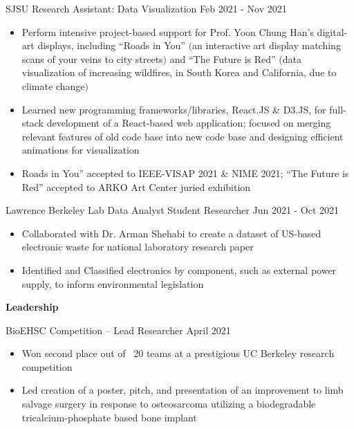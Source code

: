 \documentclass{article}
\begin{document}
\begin{spacing}{1.15}
\normalsize{
\noindent SJSU Research Assistant: Data Visualization \hfill Feb 2021 - Nov 2021
}
\small{
\begin{itemize}[noitemsep]
    \item Perform intensive project-based support for Prof. Yoon Chung Han’s digital-art displays, including “Roads in You” $($an interactive art display matching scans of your veins to city streets$)$ and “The Future is Red” $($data visualization of increasing wildfires,  in South Korea and California, due to climate change$)$
    \item Learned new programming frameworks/libraries, React.JS \& D3.JS, for full-stack development of a React-based web application; focused on merging relevant features of old code base into new code base and designing efficient animations for visualization
    \item Roads in You” accepted to IEEE-VISAP 2021 \& NIME 2021;  “The Future is Red” accepted to ARKO Art Center juried exhibition
\end{itemize}
\vspace*{0.15cm}
}

\normalsize{
\noindent Lawrence Berkeley Lab Data Analyst Student Researcher \hfill Jun 2021 - Oct 2021
}
\small{
\begin{itemize}[noitemsep]
    \item Collaborated with Dr. Arman Shehabi to create a dataset of US-based electronic waste for national laboratory research paper
    \item Identified and Classified electronics by component, such as external power supply, to inform environmental legislation
\end{itemize}
\vspace*{0.15cm}
}





\noindent\large{\bfseries Leadership \vspace*{0.2cm}} 

\normalsize{
\noindent BioEHSC Competition – Lead Researcher \hfill April 2021 
}
\small{
\begin{itemize}[noitemsep]
    \item Won second place out of ~20 teams at a prestigious UC Berkeley research competition 
    \item Led creation of a poster, pitch, and presentation of an improvement to limb salvage surgery in response to osteosarcoma utilizing a biodegradable tricalcium-phosphate based bone implant
\end{itemize}
\vspace*{0.2cm}
}


\end{spacing}
\end{document}
